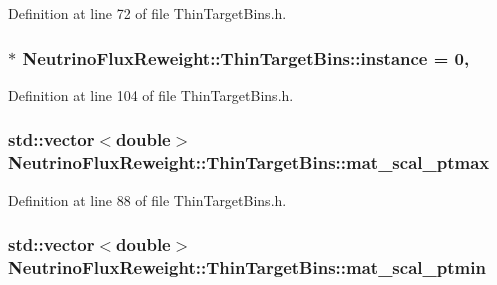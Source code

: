 Definition at line 72 of file Thin\-Target\-Bins.\-h.

\hypertarget{class_neutrino_flux_reweight_1_1_thin_target_bins_a235030b92953c5711c0a47cec4dae198}{
\subsubsection[{instance}]{ $\ast$ Neutrino\-Flux\-Reweight\-::\-Thin\-Target\-Bins\-::instance = 0\hspace{0.3cm}{\ttfamily [static]}, {\ttfamily [private]}}}\label{class_neutrino_flux_reweight_1_1_thin_target_bins_a235030b92953c5711c0a47cec4dae198}


Definition at line 104 of file Thin\-Target\-Bins.\-h.

\hypertarget{class_neutrino_flux_reweight_1_1_thin_target_bins_a0da8c145948fc4c4bad92a3ef75e3694}{
\subsubsection[{mat\-\_\-scal\-\_\-ptmax}]{\setlength{\rightskip}{0pt plus 5cm}std\-::vector$<$double$>$ Neutrino\-Flux\-Reweight\-::\-Thin\-Target\-Bins\-::mat\-\_\-scal\-\_\-ptmax}}\label{class_neutrino_flux_reweight_1_1_thin_target_bins_a0da8c145948fc4c4bad92a3ef75e3694}


Definition at line 88 of file Thin\-Target\-Bins.\-h.

\hypertarget{class_neutrino_flux_reweight_1_1_thin_target_bins_a232982a9fdc911e774661fb9a0202d38}{
\subsubsection[{mat\-\_\-scal\-\_\-ptmin}]{\setlength{\rightskip}{0pt plus 5cm}std\-::vector$<$double$>$ Neutrino\-Flux\-Reweight\-::\-Thin\-Target\-Bins\-::mat\-\_\-scal\-\_\-ptmin}}\label{class_neutrino_flux_reweight_1_1_thin_target_bins_a232982a9fdc911e774661fb9a0202d38}


